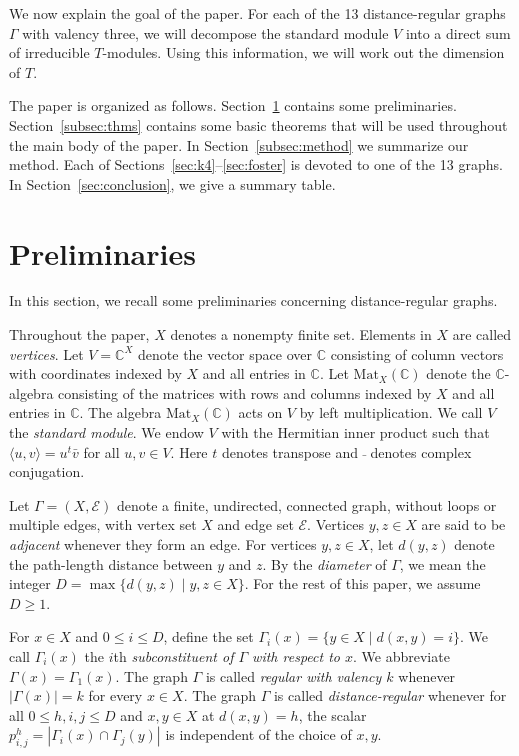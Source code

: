 \documentclass[12pt,letterpaper]{article}
\begin{document}
We now explain the goal of the paper. For each of the 13 distance-regular graphs $\Gamma$ with valency three, we will decompose the standard module $V$ into a direct sum of irreducible $T$-modules. Using this information, we will work out the dimension of $T$.

The paper is organized as follows. Section~\ref{subsec:defs} contains some preliminaries. Section~\ref{subsec:thms} contains some basic theorems that will be used throughout the main body of the paper. In Section~\ref{subsec:method} we summarize our method. Each of Sections~\ref{sec:k4}--\ref{sec:foster} is devoted to one of the 13 graphs. In Section~\ref{sec:conclusion}, we give a summary table.

\section{Preliminaries}\label{subsec:defs}

In this section, we recall some preliminaries concerning distance-regular graphs.

Throughout the paper, $X$ denotes a nonempty finite set. Elements in $X$ are called \emph{vertices}. Let $V=\mathbb{C}^X$ denote the vector space over $\mathbb{C}$ consisting of column vectors with coordinates indexed by $X$ and all entries in $\mathbb{C}$. Let $\mathrm{Mat}_X(\mathbb{C})$ denote the $\mathbb{C}$-algebra consisting of the matrices with rows and columns indexed by $X$ and all entries in $\mathbb{C}$. The algebra $\mathrm{Mat}_X(\mathbb{C})$ acts on $V$ by left multiplication. We call $V$ the \emph{standard module}. We endow $V$ with the Hermitian inner product such that $\langle u, v \rangle = u^t \bar{v}$ for all $u, v \in V$. Here $t$ denotes transpose and $\bar{~}$ denotes complex conjugation.

Let $\Gamma=(X,\mathcal{E})$ denote a finite, undirected, connected graph, without loops or multiple edges, with vertex set $X$ and edge set $\mathcal{E}$. Vertices $y,z \in X$ are said to be \emph{adjacent} whenever they form an edge. For vertices $y,z\in X$, let $d(y,z)$ denote the path-length distance between $y$ and $z$. By the \emph{diameter} of $\Gamma$, we mean the integer $D = \max\{d(y,z) \mid y,z \in X\}$. For the rest of this paper, we assume $D \ge 1$.

 For $x\in X$ and $0 \le i \le D$, define the set $\Gamma_i(x)=\{y \in X \mid d(x,y)=i\}$. We call $\Gamma_i(x)$ the $i$th \textit{subconstituent of $\Gamma$ with respect to $x$}. We abbreviate $\Gamma(x)=\Gamma_1(x)$. The graph $\Gamma$ is called \emph{regular with valency $k$} whenever $|\Gamma(x)|=k$ for every $x\in X$. The graph $\Gamma$ is called \textit{distance-regular} whenever for all $0 \le h,i,j \le D$ and $x,y \in X$ at $d(x,y) =h$, the scalar $p_{i,j}^h=|\Gamma_i(x)\cap \Gamma_j(y)|$ is independent of the choice of $x,y$.
\end{document}

